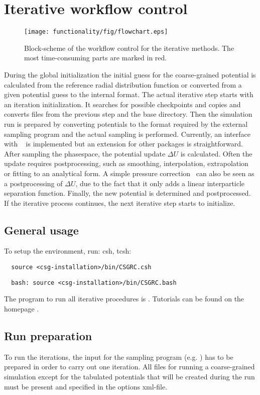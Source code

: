 \section{Iterative workflow control}

\begin{figure}
  \texttt{[image: functionality/fig/flowchart.eps]}
  \caption{
    \label{fig:flowchart}
    Block-scheme of the workflow control for the iterative methods. The most time-consuming parts are marked in red.
  }
\end{figure}

During the global initialization the initial guess for the coarse-grained potential is calculated from the reference radial distribution function or converted from a given potential guess to the internal format. The actual iterative step starts with an iteration initialization. It searches for possible checkpoints and copies and converts files from the previous step and the base directory. Then the simulation run is prepared by converting potentials to the format required by the external sampling program and the actual sampling is performed. Currently, an interface with \gromacs~\cite{gromacs4} is implemented but an extension for other packages is straightforward. After sampling the phasespace, the potential update $\Delta U$ is calculated. Often the update requires postprocessing, such as smoothing, interpolation, extrapolation or fitting to an analytical form. A simple pressure correction~\cite{Reith:2003} can also be seen as a postprocessing of $\Delta U$, due to the fact that it only adds a linear interparticle separation function.
%
Finally, the new potential is determined and postprocessed. If the iterative process continues, the next iterative step starts to initialize.

\subsection{General usage}
To setup the environment, run:
csh, tcsh:
\begin{verbatim}
  source <csg-installation>/bin/CSGRC.csh
\end{verbatim}
\begin{verbatim}
  bash: source <csg-installation>/bin/CSGRC.bash
\end{verbatim}
The program to run all iterative procedures is . Tutorials can be found on the \votca homepage \votcaweb. 

\subsection{Run preparation}
To run the iterations, the input for the sampling program (e.g. \gromacs ) has to be prepared in order to carry out one iteration. All files for running a coarse-grained simulation except for the tabulated potentials that will be created during the run must be present and specified in the options xml-file.

